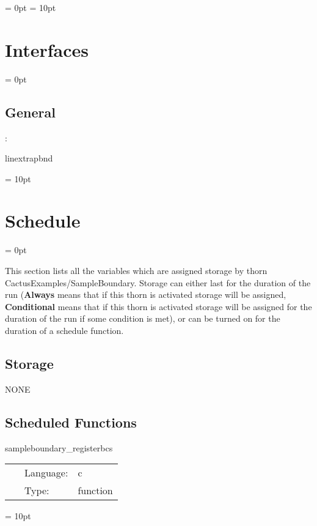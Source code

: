 \documentclass{article}
\begin{document}
\parskip = 0pt
\parskip = 10pt 

\section{Interfaces} 


\parskip = 0pt

\vspace{3mm} \subsection*{General}

: 

linextrapbnd
\vspace{2mm}

\vspace{5mm}\parskip = 10pt 

\section{Schedule} 


\parskip = 0pt


\noindent This section lists all the variables which are assigned storage by thorn CactusExamples/SampleBoundary.  Storage can either last for the duration of the run ({\bf Always} means that if this thorn is activated storage will be assigned, {\bf Conditional} means that if this thorn is activated storage will be assigned for the duration of the run if some condition is met), or can be turned on for the duration of a schedule function.


\subsection*{Storage}NONE
\subsection*{Scheduled Functions}
\vspace{5mm}


\hspace{5mm} sampleboundary\_registerbcs 

\hspace{5mm}{\it register boundary conditions that this thorn provides } 


\hspace{5mm}

 \begin{tabular*}{160mm}{cll} 
~ & Language:  & c \\ 
~ & Type:  & function \\ 
\end{tabular*} 



\vspace{5mm}\parskip = 10pt 
\end{document}
